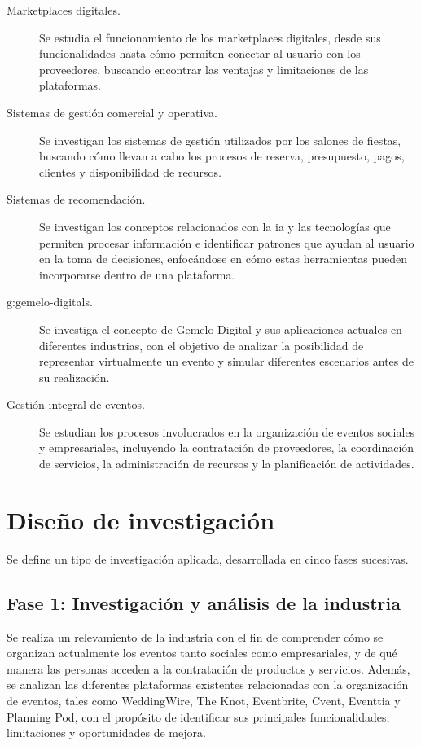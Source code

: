 \begin{description}
    \item[Marketplaces digitales.] Se estudia el funcionamiento de los
          marketplaces digitales, desde sus funcionalidades hasta cómo
          permiten conectar al usuario con los proveedores, buscando
          encontrar las ventajas y limitaciones de las plataformas.
    \item[Sistemas de gestión comercial y operativa.] Se investigan los
          sistemas de gestión utilizados por los salones de fiestas,
          buscando cómo llevan a cabo los procesos de reserva, presupuesto,
          pagos, clientes y disponibilidad de recursos.
    \item[Sistemas de recomendación.] Se investigan los conceptos
          relacionados con la \gls{ia} y las tecnologías que permiten
          procesar información e identificar patrones que ayudan al
          usuario en la toma de decisiones, enfocándose en cómo estas
          herramientas pueden incorporarse dentro de una plataforma.
    \item[\glspl{g:gemelo-digital}.] Se investiga el concepto de Gemelo
          Digital y sus aplicaciones actuales en diferentes industrias,
          con el objetivo de analizar la posibilidad de representar
          virtualmente un evento y simular diferentes escenarios antes de
          su realización.
    \item[Gestión integral de eventos.] Se estudian los procesos
          involucrados en la organización de eventos sociales y
          empresariales, incluyendo la contratación de proveedores, la
          coordinación de servicios, la administración de recursos y la
          planificación de actividades.
\end{description}

\section{Diseño de investigación}

Se define un tipo de investigación aplicada, desarrollada en cinco fases
sucesivas.

\subsection{Fase 1: Investigación y análisis de la industria}

Se realiza un relevamiento de la industria con el fin de comprender cómo
se organizan actualmente los eventos tanto sociales como empresariales, y
de qué manera las personas acceden a la contratación de productos y
servicios. Además, se analizan las diferentes plataformas existentes
relacionadas con la organización de eventos, tales como WeddingWire, The
Knot, Eventbrite, Cvent, Eventtia y Planning Pod, con el propósito de
identificar sus principales funcionalidades, limitaciones y oportunidades
de mejora.

